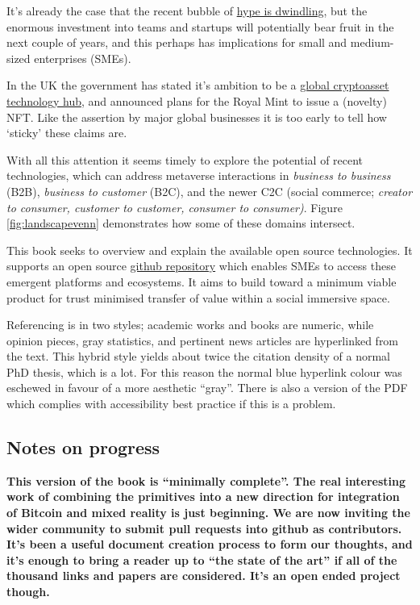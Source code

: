 \documentclass[
	12pt, %
	fleqn, %
	a4paper, %
	oneside, %
]{LegrandOrangeBook}
\begin{document}
It's already the case that the recent bubble of \href{https://www.forbes.com/sites/paultassi/2022/03/10/interest-in-nfts-and-the-metaverse-is-falling-fast/?}{hype is dwindling}, but the enormous investment into teams and startups will potentially bear fruit in the next couple of years, and this perhaps has implications for small and medium-sized enterprises (SMEs). \par
In the UK the government has stated it's ambition to be a \href{https://www.gov.uk/government/news/government-sets-out-plan-to-make-uk-a-global-cryptoasset-technology-hub}{global cryptoasset technology hub}, and announced plans for the Royal Mint to issue a (novelty) NFT. Like the assertion by major global businesses it is too early to tell how `sticky' these claims are.\par
With all this attention it seems timely to explore the potential of recent technologies, which can address metaverse interactions in \textit{business to business} (B2B), \textit{business to customer} (B2C), and the newer C2C (social commerce; \textit{creator to consumer, customer to customer, consumer to consumer\cite{jones2008trust})}. Figure \ref{fig:landscapevenn} demonstrates how some of these domains intersect.\par
This book seeks to overview and explain the available open source technologies. It supports an open source \href{https://github.com/GMCyberFoundry/Metaverse}{github repository} which enables SMEs to access these emergent platforms and ecosystems. It aims to build toward a minimum viable product for trust minimised transfer of value within a social immersive space.\par
Referencing is in two styles; academic works and books are numeric, while opinion pieces, gray statistics, and pertinent news articles are hyperlinked from the text. This hybrid style yields about twice the citation density of a normal PhD thesis, which is a lot. For this reason the normal blue hyperlink colour was eschewed in favour of a more aesthetic ``gray''. There is also a version of the PDF which complies with accessibility best practice if this is a problem.  \par 
\subsection{Notes on progress}
\textbf{This version of the book is ``minimally complete''. The real interesting work of combining the primitives into a new direction for integration of Bitcoin and mixed reality is just beginning. We are now inviting the wider community to submit pull requests into github as contributors. It's been a useful document creation process to form our thoughts, and it's enough to bring a reader up to ``the state of the art'' if all of the thousand  links and papers are considered. It's an open ended project though.}\
\end{document}
